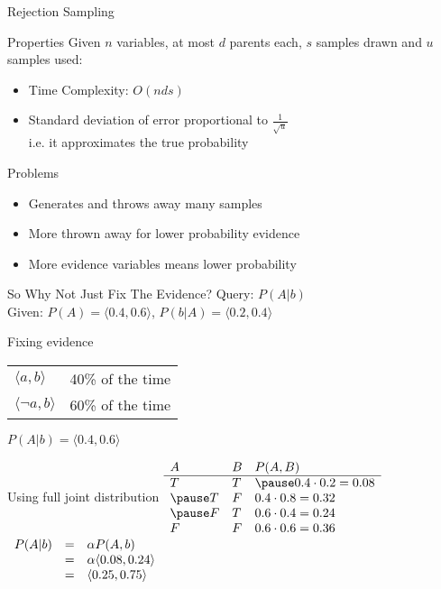\documentclass[14pt]{beamer}
\begin{document}
\begin{frame}{Rejection Sampling}
	\begin{block}{Properties}
		Given $n$ variables, at most $d$ parents each, $s$ samples drawn and $u$ samples used:
		\begin{itemize}
			\item Time Complexity: \pause $O(nds)$
			\pause
			\item Standard deviation of error proportional to $\frac{1}{\sqrt{u}}$ \\
			      \pause
			      i.e. it approximates the true probability
		\end{itemize}
	\end{block}
	\pause
	\begin{block}{Problems}
		\begin{itemize}
			\item Generates and throws away many samples
			\item More thrown away for lower probability evidence
			\item More evidence variables means lower probability
		\end{itemize}
	\end{block}
\end{frame}

\begin{frame}{So Why Not Just Fix The Evidence?}
Query: $P(A|b)$ \\
Given: $P(A) = \langle 0.4, 0.6 \rangle$, $P(b|A) = \langle 0.2, 0.4\rangle$
\pause
\begin{block}{Fixing evidence}
\pause
\begin{tabular}{ l l }
$\langle a, b \rangle$ & 40\% of the time \\
$\langle \lnot a, b \rangle$ & 60\% of the time
\end{tabular}
\pause
\hspace{1em}
$P(A|b) = \langle 0.4, 0.6 \rangle$
\end{block}
\pause
\begin{block}{Using full joint distribution}
\pause
$\begin{array}{ l l l }
A & B & P(A,B) \\
\hline
T & T & \pause 0.4 \cdot 0.2 = 0.08 \\
\pause
T & F & 0.4 \cdot 0.8 = 0.32 \\
\pause
F & T & 0.6 \cdot 0.4 = 0.24 \\
F & F & 0.6 \cdot 0.6 = 0.36 \\
\end{array}$
\pause
\hspace{1.75em}
\setlength{\arraycolsep}{0.2em}
$\begin{array}{ l l l }
P(A|b)
& = & \alpha P(A, b) \\
& = & \alpha \langle 0.08, 0.24 \rangle \\
& = & \langle 0.25, 0.75 \rangle
\end{array}$
\end{block}
\end{frame}
\end{document}
